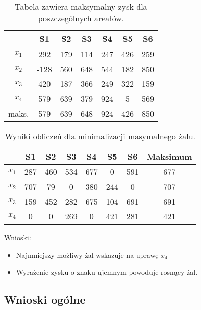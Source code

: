 \documentclass{article}
\begin{document}
\begin{table}[H]
  \begin{center}
    \begin{tabular}{ c |  c  c   c   c   c   c  }
      & S1 & S2 & S3 & S4 & S5 & S6 \\
      \hline
      $x_1$ & 292 & 179 & 114 & 247 & 426 & 259 \\
      $x_2$ & -128 & 560 & 648 & 544 & 182 & 850 \\
      $x_3$ & 420 & 187 & 366 & 249 & 322 & 159 \\
      $x_4$ & 579 & 639 & 379 & 924 & 5 & 569 \\
      \hline
      maks. & 579 & 639 & 648 & 924 & 426 & 850 \\
    \end{tabular} 
    \caption{\label{table:areals} Tabela zawiera maksymalny zysk dla poszczególnych areałów.}
  \end{center}
\end{table}

\begin{table}[H]
  \begin{center}
    \begin{tabular}{ c |  c  c   c   c   c   c | c  }
      & S1 & S2 & S3 & S4 & S5 & S6 & Maksimum \\
      \hline
      $x_1$ & 287 & 460 & 534 & 677 & 0   & 591 & 677 \\
      $x_2$ & 707 & 79  & 0   & 380 & 244 & 0   & 707 \\
      $x_3$ & 159 & 452 & 282 & 675 & 104 & 691 & 691 \\
      $x_4$ & 0   & 0   & 269 & 0   & 421 & 281 & \cellcolor{green!25}421 \\
      \hline
    \end{tabular} 
    \caption{\label{table:zal} Wyniki obliczeń dla minimalizacji masymalnego żalu. }
  \end{center}
\end{table}

Wnioski:

\begin{itemize}
  \item Najmniejszy możliwy żal wskazuje na uprawę $x_4$
  \item Wyrażenie zysku o znaku ujemnym powoduje rosnący żal.
\end{itemize}

\subsection{Wnioski ogólne}
\end{document}
